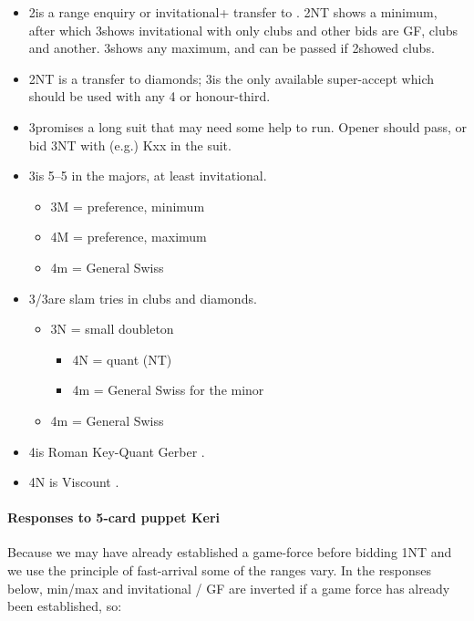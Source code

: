 \documentclass[a4paper,14pt]{extarticle}
\begin{document}
\begin{itemize}
\item 2\spades is a range enquiry or invitational+ transfer to
\clubs.  2NT shows a minimum, after which 3\clubs shows invitational
with only clubs and other bids are GF, clubs and another.  3\clubs shows
any maximum, and can be passed if 2\spades showed clubs.

\item 2NT is a transfer to diamonds; 3\clubs is the only available super-accept which 
should be used with any 4 or honour-third.

\item 3\clubs promises a long suit that may need some help to run.  Opener should
pass, or bid 3NT with (e.g.) Kxx in the suit.

\item 3\diamonds is 5--5 in the majors, at least invitational.
	\begin{itemize}
	\item 3M = preference, minimum
	\item 4M = preference, maximum
	\item 4m = General Swiss 
	\end{itemize}

\item 3\hearts/3\spades are slam tries in clubs and diamonds.
	\begin{itemize}
	\item 3N = small doubleton
		\begin{itemize}
		\item 4N = quant (NT)
		\item 4m = General Swiss  for the minor
		\end{itemize}
	\item 4m = General Swiss 
	\end{itemize}

\item 4\clubs is Roman Key-Quant Gerber .

\item 4N is Viscount .

\end{itemize}

\paragraph{Responses to 5-card puppet Keri}
\label{note:7}

Because we may have already established a game-force before bidding 1NT and we
use the principle of fast-arrival some of the ranges vary. In the responses
below, min/max and invitational / GF are inverted if a game force has already
been established, so:
\end{document}
